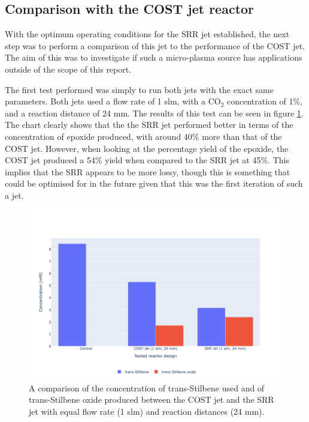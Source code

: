 \subsection{Comparison with the COST jet reactor}

With the optimum operating conditions for the SRR jet established, the next step was to perform a comparison of this jet to the performance of the COST jet. The aim of this was to investigate if such a micro-plasma source has applications outside of the scope of this report. 

The first test performed was simply to run both jets with the exact same parameters. Both jets used a flow rate of 1 slm, with a CO$_2$ concentration of 1\%, and a reaction distance of 24 mm. The results of this test can be seen in figure \ref{fig:cost_vs_srr_24mm_test}. The chart clearly shows that the the SRR jet performed better in terms of the concentration of epoxide produced, with around 40\% more than that of the COST jet. However, when looking at the percentage yield of the epoxide, the COST jet produced a 54\% yield when compared to the SRR jet at 45\%. This implies that the SRR appears to be more lossy, though this is something that could be optimised for in the future given that this was the first iteration of such a jet. 

\begin{figure}[h!]
	\centering
    \includegraphics[width=\linewidth]{chapter_6/figures/cost_vs_srr_24mm_test.png} 
	\caption{A comparison of the concentration of trans-Stilbene used and of trans-Stilbene oxide produced between the COST jet and the SRR jet with equal flow rate (1 slm) and reaction distances (24 mm).}
	\label{fig:cost_vs_srr_24mm_test}
\end{figure} 

